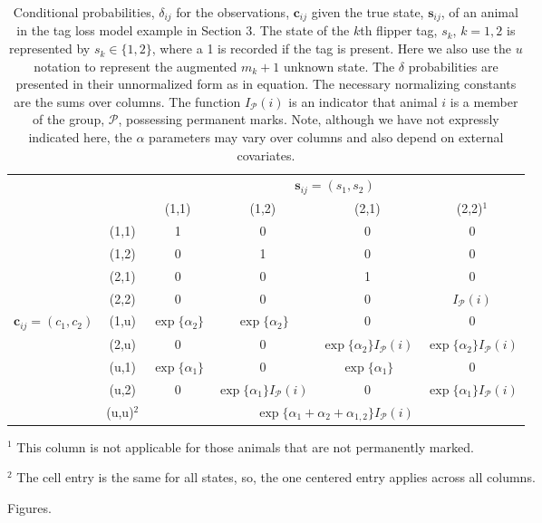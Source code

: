 \documentclass[fleqn]{article}
\newcommand{\bs}{\ensuremath{\mathbf{s}}}
\newcommand{\bc}{\ensuremath{\mathbf{c}}}
\begin{document}
\begin{table}[ht]
\centering
\parbox{\textwidth}{\caption{\label{tb:tagloss.delta}  Conditional probabilities, $\delta_{ij}$ for the observations, $\bc_{ij}$ given the true state, $\bs_{ij}$, of an animal in the tag loss model example in Section 3. The state of the $k$th flipper tag, $s_k$, $k=1,2$ is represented by $s_k \in \{1,2\}$, where a 1 is recorded if the tag is present. Here we also use the $u$ notation to represent the augmented $m_k+1$ unknown state. The $\delta$ probabilities are presented in their unnormalized form as in equation. The necessary normalizing constants are the sums over columns. The function $I_{\mathcal{P}}(i)$ is an indicator that animal $i$ is a member of the group, $\mathcal{P}$, possessing permanent marks. Note, although we have not expressly indicated here, the $\alpha$ parameters may vary over columns and also depend on external covariates.}}\medskip

\begin{tabular}{cc|cccc|} \cline{3-6}
                                     &                            & \multicolumn{4}{c|}{$\bs_{ij} = (s_1,s_2)$}\\ %
                                     &                            & (1,1) & (1,2) & (2,1) & (2,2)$^1$  \\ \hline
\multicolumn{1}{|c}{}                & \multicolumn{1}{c|}{(1,1)} & 1 & 0 & 0 & 0 \\
\multicolumn{1}{|c}{}                & \multicolumn{1}{c|}{(1,2)} & 0 & 1  & 0 & 0 \\
\multicolumn{1}{|c}{}                & \multicolumn{1}{c|}{(2,1)} & 0 & 0 & 1 & 0 \\
\multicolumn{1}{|c}{}                & \multicolumn{1}{c|}{(2,2)} & 0 & 0 & 0 & $I_\mathcal{P}(i)$ \\ 
\multicolumn{1}{|c}{$\bc_{ij}=(c_1,c_2)$} & \multicolumn{1}{c|}{(1,u)} & $\exp\{\alpha_2\}$ & $\exp\{\alpha_2\}$ & 0 & 0 \\
\multicolumn{1}{|c}{}                & \multicolumn{1}{c|}{(2,u)} & 0 & 0 & $\exp\{\alpha_2\}I_\mathcal{P}(i)$ & $\exp\{\alpha_2\}I_\mathcal{P}(i)$\\
\multicolumn{1}{|c}{}                & \multicolumn{1}{c|}{(u,1)} & $\exp\{\alpha_1\}$ & 0 & $\exp\{\alpha_1\}$ & 0\\
\multicolumn{1}{|c}{}                & \multicolumn{1}{c|}{(u,2)} & 0 & $\exp\{\alpha_1\}I_\mathcal{P}(i)$ & 0 & $\exp\{\alpha_1\}I_\mathcal{P}(i)$\\
\multicolumn{1}{|c}{}                & \multicolumn{1}{c|}{(u,u)$^2$} & \multicolumn{4}{c|}{$\exp\{\alpha_1+\alpha_2 + \alpha_{1,2}\}I_\mathcal{P}(i)$}  \\
\hline
\end{tabular}\medskip

\parbox{\textwidth}{ \footnotesize
$^1$ This column is not applicable for those animals that are not permanently marked.

$^2$ The cell entry is the same for all states, so, the one centered entry applies across all columns.
}
\end{table}


\clearpage

Figures.
\end{document}
